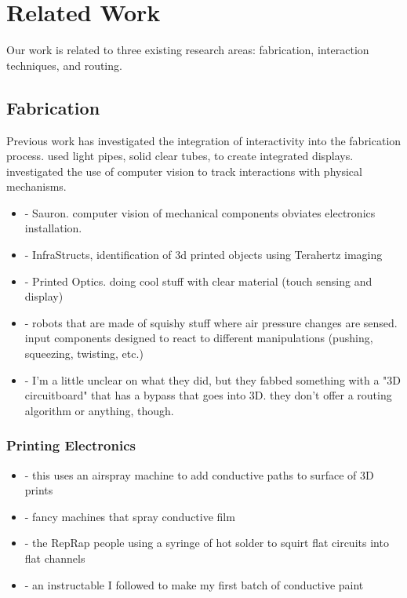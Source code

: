 \section{Related Work}

Our work is related to three existing research areas: fabrication, interaction techniques, and routing.

\subsection{Fabrication}

Previous work has investigated the integration of interactivity into the fabrication process.  \cite{Willis-printedoptics} used light pipes, solid clear tubes, to create integrated displays.  \cite{Savage-sauron} investigated the use of computer vision to track interactions with physical mechanisms.
\begin{itemize}
\item \cite{Savage-sauron} - Sauron.  computer vision of mechanical components obviates electronics installation.
\item \cite{Willis-infrastructs} - InfraStructs, identification of 3d printed objects using Terahertz imaging
\item \cite{Willis-printedoptics} - Printed Optics.  doing cool stuff with clear material (touch sensing and display)
\item \cite{Slyper-pressure} - robots that are made of squishy stuff where air pressure changes are sensed.  input components designed to react to different manipulations (pushing, squeezing, twisting, etc.)
\item \cite{Navarrette-gps} - I'm a little unclear on what they did, but they fabbed something with a "3D circuitboard" that has a bypass that goes into 3D.  they don't offer a routing algorithm or anything, though.
\end{itemize}

\subsubsection{Printing Electronics}
\begin{itemize}
\item \cite{Sarik-tracebrush} - this uses an airspray machine to add conductive paths to surface of 3D prints
\item \cite{Optomec} - fancy machines that spray conductive film
\item \cite{Sells-reprap} - the RepRap people using a syringe of hot solder to squirt flat circuits into flat channels
\item \cite{icecats-conductivepaint} - an instructable I followed to make my first batch of conductive paint
\end{itemize}

